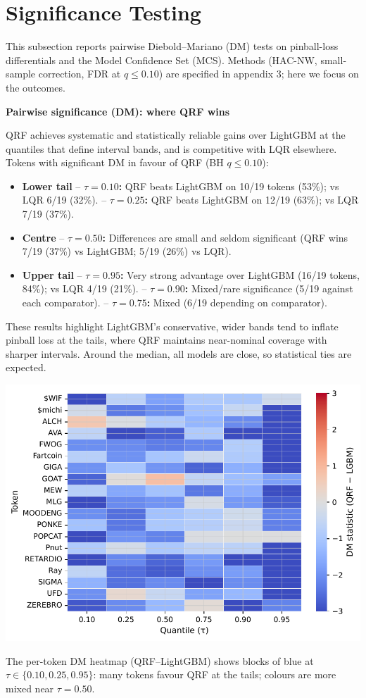 \documentclass[
  a4paper,
  DIV=11,
  numbers=noendperiod]{scrreprt}
\begin{document}
\section{Significance Testing}\label{significance-testing}

This subsection reports pairwise Diebold--Mariano (DM) tests on
pinball-loss differentials and the Model Confidence Set (MCS). Methods
(HAC-NW, small-sample correction, FDR at \(q\le 0.10\)) are specified in
appendix 3; here we focus on the outcomes.

\textbf{Pairwise significance (DM): where QRF wins}

QRF achieves systematic and statistically reliable gains over LightGBM
at the quantiles that define interval bands, and is competitive with LQR
elsewhere. Tokens with significant DM in favour of QRF (BH
\(q\le 0.10\)):

\begin{itemize}
\item
  \textbf{Lower tail} -- \textbf{\(\tau=0.10\):} QRF beats LightGBM on
  10/19 tokens (53\%); vs LQR 6/19 (32\%). -- \textbf{\(\tau=0.25\):}
  QRF beats LightGBM on 12/19 (63\%); vs LQR 7/19 (37\%).
\item
  \textbf{Centre} -- \textbf{\(\tau=0.50\):} Differences are small and
  seldom significant (QRF wins 7/19 (37\%) vs LightGBM; 5/19 (26\%) vs
  LQR).
\item
  \textbf{Upper tail} -- \textbf{\(\tau=0.95\):} Very strong advantage
  over LightGBM (16/19 tokens, 84\%); vs LQR 4/19 (21\%). --
  \textbf{\(\tau=0.90\):} Mixed/rare significance (5/19 against each
  comparator). -- \textbf{\(\tau=0.75\):} Mixed (6/19 depending on
  comparator).
\end{itemize}

These results highlight LightGBM's conservative, wider bands tend to
inflate pinball loss at the tails, where QRF maintains near-nominal
coverage with sharper intervals. Around the median, all models are
close, so statistical ties are expected.

\begin{center}
\includegraphics[width=0.8\linewidth,height=\textheight,keepaspectratio]{figures/final/fig-dm-heatmap-qrf-vs-lgbm.pdf}
\end{center}
The per-token DM heatmap (QRF--LightGBM) shows blocks of blue at
\(\tau\in\{0.10,0.25,0.95\}\): many tokens favour QRF at the tails;
colours are more mixed near \(\tau=0.50\).
\end{document}
